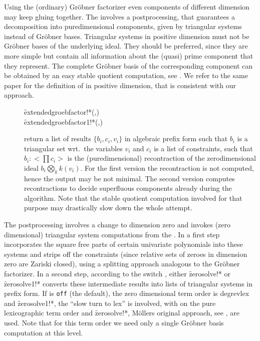 Using the (ordinary) Gr\"obner factorizer even components of different
dimension may keep gluing together. The 
involves a postprocessing, that guarantees a decomposition into
puredimensional components, given by triangular systems instead of Gr\"obner
bases. Triangular systems in positive dimension must not be Gr\"obner bases
of the underlying ideal. They should be preferred, since they are more
simple but contain all information about the (quasi) prime component
that they represent. The complete Gr\"obner basis of the corresponding
component can be obtained by an easy stable quotient computation, see
\cite{Graebe:95b}. We refer to the same paper for the definition of
 in positive dimension, that is consistent
with our approach.
\begin{description}
\item[]
  \begin{syntaxtable}
    \f{extendedgroebfactor!*}(,) \\
    \f{extendedgroebfactor1!*}(,)
  \end{syntaxtable}
  \hypertarget{procedure:EXTENDEDGROEBFACTOR!*}{}
return a list of results $\{b_i,c_i,v_i\}$ in algebraic prefix
form such that $b_i$ is a triangular set wrt.\ the variables $v_i$ and
$c_i$ is a list of constraints, such that $b_i:<\prod c_i>$ is the
(puredimensional) recontraction of the zerodimensional ideal
$b_i\bigotimes_k k(v_i)$. For  the first version the recontraction is
not computed, hence the output may be not minimal. The second version
computes recontractions to decide superfluous components already
during the algorithm. Note that the stable quotient computation
involved for that purpose may drastically slow down the whole
attempt.
\end{description}
The postprocessing involves a change to dimension zero and invokes
(zero dimensional) triangular system computations from the
. In a first step 
incorporates the square free parts of certain univariate polynomials
into these systems and strips off the constraints (since relative sets
of zeroes in dimension zero are Zariski closed), using a splitting
approach analogous to the Gr\"obner factorizer. In a second step, according
to the switch , either \f{zerosolve!*} or
\f{zerosolve1!*} converts these intermediate results into lists of
triangular systems in prefix form. If  is \texttt{off} (the
default), the zero dimensional term order is degrevlex and
\f{zerosolve1!*}, the ``slow turn to lex'' is involved, with 
on the pure lexicographic term order and \f{zerosolve!*},
M\"ollers original approach, see \cite{Moeller:93}, are used. Note that
for this term order we need only a single Gr\"obner basis computation at
this level.

